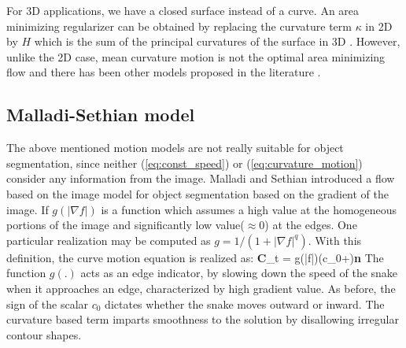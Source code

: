 For 3D applications, we have a closed surface instead of a curve. An area minimizing regularizer can be obtained by replacing the curvature term $\kappa$ in 2D by $H$ which is the sum of the principal curvatures of the surface in 3D \cite{caselles_minimal_surface}. However, unlike the 2D case, mean curvature motion is not the optimal area minimizing flow and there has been other models proposed in the literature \cite{caselles_minimal_surface,tannenbaum1997invariant}.

\subsection{Malladi-Sethian model}
The  above mentioned motion models are not really suitable for object segmentation, since neither (\ref{eq:const_speed}) or (\ref{eq:curvature_motion}) consider any information from the image. Malladi and Sethian \cite{malladi_sethian} introduced a flow based on the image model for object segmentation based on the gradient of the image. If $g(|\nabla f|)$ is a function which assumes a high value at the homogeneous portions of the image and significantly low value($\approx 0$) at the edges. One particular realization may be computed as $g=1/(1+|\nabla f|^q)$. With this definition, the curve motion equation is realized as:
\bea
\textbf{C}_t = g(|\nabla f|)(c_0+\kappa)\;\textbf{n}
\label{eq:malladi_sethian}
\eea
The function $g(.)$ acts as an edge indicator, by slowing down the speed of the snake when it approaches an edge, characterized by high gradient value. As before, the sign of the scalar $c_0$ dictates whether the snake moves outward or inward. The curvature based term imparts smoothness to the solution by disallowing irregular contour shapes.


